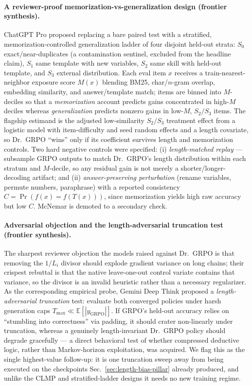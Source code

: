 \paragraph{A reviewer-proof memorization-vs-generalization design (frontier synthesis).}
ChatGPT Pro proposed replacing a bare paired test with a stratified,
memorization-controlled generalization ladder of four disjoint held-out strata:
$S_0$ exact/near-duplicates (a contamination sentinel, excluded from the headline
claim), $S_1$ same template with new variables, $S_2$ same skill with held-out
template, and $S_3$ external distribution. Each eval item $x$ receives a
train-nearest-neighbor exposure score $M(x)$ blending BM25, char/$n$-gram overlap,
embedding similarity, and answer/template match; items are binned into
$M$-deciles so that a \emph{memorization} account predicts gains concentrated in
high-$M$ deciles whereas \emph{generalization} predicts nonzero gains in low-$M$,
$S_2/S_3$ items. The flagship estimand is the adjusted low-similarity
$S_2/S_3$ treatment effect from a logistic model with item-difficulty and
seed random effects and a length covariate, so Dr.~GRPO ``wins'' only if its
coefficient survives length and memorization controls. Two hard negative
controls were specified: (i) \emph{length-matched replay} --- subsample GRPO
outputs to match Dr.~GRPO's length distribution within each stratum and
$M$-decile, so any residual gain is not merely a shorter/longer-decoding
artifact; and (ii) \emph{answer-preserving perturbation} (rename variables,
permute numbers, paraphrase) with a reported consistency
$C=\Pr\!\left(f(x)=f(T(x))\right)$, since memorization yields high raw accuracy
but low $C$. McNemar is demoted to a secondary check.

\paragraph{Adversarial objection and the length-adversarial truncation test (frontier synthesis).}
The sharpest reviewer objection the models raised against Dr.~GRPO is that
removing the $1/L_i$ divisor should explode gradient variance on long chains;
their crispest rebuttal is that the native leave-one-out control variate contains
that variance, so the divisor is an invalid heuristic rather than a necessary
regularizer. As the corresponding empirical probe, Gemini Deep Think proposed a
\emph{length-adversarial truncation} test: evaluate both converged policies under
harsh generation caps $T_{\max}\ll\mathbb{E}[|y_{\mathrm{GRPO}}|]$. If GRPO's
held-out accuracy relies on ``stumbling into correctness'' via padding, it should
crater non-linearly under truncation, whereas a genuinely length-invariant
Dr.~GRPO policy should degrade gracefully --- a direct behavioral test of whether
compressed deductive logic, rather than Markov-horizon exploitation, was
acquired. We flag this as the single highest-value follow-up: it is one
truncation sweep away from being executed on the checkpoints
Sec.~\ref{sec:length-bias-pillar} already produced, and unlike the CLMP and
stratified-ladder designs it needs no new training regime.
